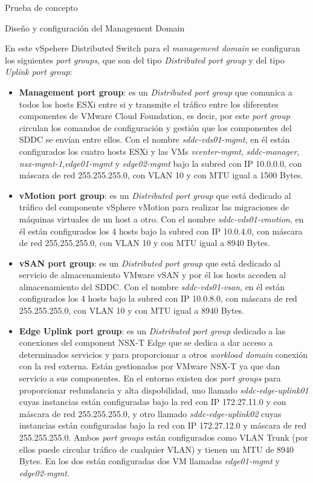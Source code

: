\begin{section}{Prueba de concepto}
\begin{subsection}{Diseño y configuración del Management Domain}
\begin{itemize}
    \end{itemize}
    En este vSpehere Distributed Switch para el \textit{management domain} se configuran los siguientes \textit{port groups}, que son del tipo \textit{Distributed port group} y del tipo \textit{Uplink port group}:
    \begin{itemize}
           
            \item \textbf{Management port group}: es un \textit{Distributed port group} que comunica a todos los hosts ESXi entre si y transmite el tráfico entre los diferentes componentes de VMware Cloud Foundation, es decir, por este \textit{port group} circulan los comandos de configuración y gestión que los componentes del SDDC se envían entre ellos. Con el nombre \textit{sddc-vds01-mgmt}, en él están configurados los cuatro hosts ESXi y las VMs \textit{vcenter-mgmt}, \textit{sddc-manager}, \textit{nsx-mgmt-1},\textit{edge01-mgmt} y \textit{edge02-mgmt} bajo la subred con IP 10.0.0.0, con máscara de red 255.255.255.0, con VLAN 10 y con MTU igual a 1500 Bytes.
            
            \item \textbf{vMotion port group}: es un \textit{Distributed port group} que está dedicado al tráfico del componente vSphere vMotion para realizar las migraciones de máquinas virtuales de un host a otro. Con el nombre \textit{sddc-vds01-vmotion}, en él están configurados los 4 hosts bajo la subred con IP 10.0.4.0, con máscara de red 255.255.255.0, con VLAN 10 y con MTU igual a 8940 Bytes.
            
            \item \textbf{vSAN port group}: es un \textit{Distributed port group} que está dedicado al servicio de almacenamiento VMware vSAN y por él los hosts acceden al almacenamiento del SDDC. Con el nombre \textit{sddc-vds01-vsan}, en él están configurados los 4 hosts bajo la subred con IP 10.0.8.0, con máscara de red 255.255.255.0, con VLAN 10 y con MTU igual a 8940 Bytes.
            
            \item \textbf{Edge Uplink port group}: es un \textit{Distributed port group} dedicado a las conexiones del component NSX-T Edge que se dedica a dar acceso a determinados servicios y para proporcionar a otros \textit{workload domain} conexión con la red externa. Están gestionados por VMware NSX-T ya que dan servicio a sus componentes. En el entorno existen dos \textit{port groups} para proporcionar redundancia y alta dispobilidad, uno llamado \textit{sddc-edge-uplink01} cuyas instancias están configuradas bajo la red con IP 172.27.11.0 y con máscara de red 255.255.255.0, y otro llamado \textit{sddc-edge-uplink02} cuyas instancias están configuradas bajo la red con IP 172.27.12.0 y máscara de red 255.255.255.0. Ambos \textit{port groups} están configurados como VLAN Trunk (por ellos puede circular tráfico de cualquier VLAN) y tienen un MTU de 8940 Bytes. En los dos están configuradas dos VM llamadas \textit{edge01-mgmt} y \textit{edge02-mgmt}.
            

\end{itemize}
\end{subsection}
\end{section}
